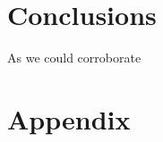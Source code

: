 \documentclass[11pt,a4paper]{report}
\begin{document}
\chapter{Conclusions}
    As we could corroborate

%
%

\appendix
\chapter{Appendix}
\end{document}

